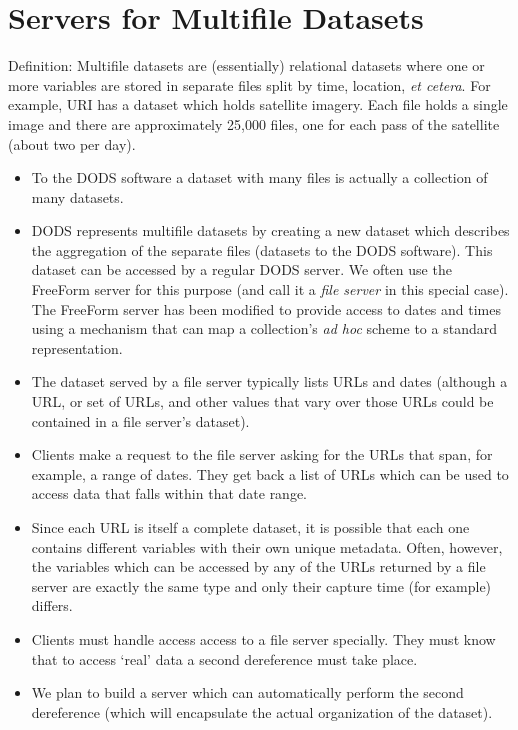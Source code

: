 \documentclass{article}
\begin{document}
\section{Servers for Multifile Datasets}
\label{sec:multifile}

Definition: Multifile datasets are (essentially) relational datasets where
one or more variables are stored in separate files split by time, location,
\textit{et cetera}. For example, URI has a dataset which holds satellite
imagery.  Each file holds a single image and there are approximately 25,000
files, one for each pass of the satellite (about two per day).

\begin{itemize}
\item To the DODS software a dataset with many files is actually a collection
  of many datasets. 
  
\item DODS represents multifile datasets by creating a new dataset which
  describes the aggregation of the separate files (datasets to the DODS
  software). This dataset can be accessed by a regular DODS server. We often
  use the FreeForm server for this purpose (and call it a \emph{file server}
  in this special case). The FreeForm server has been modified to provide
  access to dates and times using a mechanism that can map a collection's
  \textit{ad hoc} scheme to a standard representation.
  
\item The dataset served by a file server typically lists URLs and dates
  (although a URL, or set of URLs, and other values that vary over those URLs
  could be contained in a file server's dataset).
  
\item Clients make a request to the file server asking for the URLs that
  span, for example, a range of dates.  They get back a list of URLs which
  can be used to access data that falls within that date range.
  
\item Since each URL is itself a complete dataset, it is possible that each
  one contains different variables with their own unique metadata. Often,
  however, the variables which can be accessed by any of the URLs returned by
  a file server are exactly the same type and only their capture time (for
  example) differs.
  
\item Clients must handle access access to a file server specially. They must
  know that to access `real' data a second dereference must take place.
  
\item We plan to build a server which can automatically perform the second
  dereference (which will encapsulate the actual organization of the
  dataset).
\end{itemize}
\end{document}
